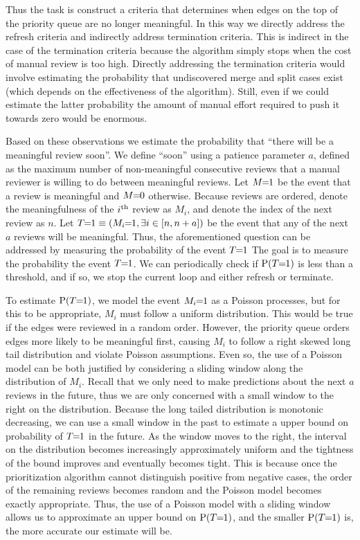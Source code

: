 Thus the task is construct a criteria that determines when edges on the top of the priority queue are no longer
  meaningful.
In this way we directly address the refresh criteria and indirectly address termination criteria.
This is indirect in the case of the termination criteria because the algorithm simply stops when the cost of
  manual review is too high.
Directly addressing the termination criteria would involve estimating the probability that undiscovered merge and
  split cases exist (which depends on the effectiveness of the algorithm).
Still, even if we could estimate the latter probability the amount of manual effort required to push it towards
  zero would be enormous.



Based on these observations we estimate the probability that ``there will be a meaningful review soon''. We define
``soon'' using a patience parameter $a$, defined as the maximum number of non-meaningful consecutive reviews that a
manual reviewer is willing to do between meaningful reviews. Let $M\mkern-6mu=\mkern-6mu1$ be the event that a review is meaningful
and $M\mkern-6mu=\mkern-6mu0$ otherwise. Because reviews are ordered, denote the meaningfulness of the $i^{\textrm{th}}$ review as $M_i$, and
denote the index of the next review as $n$. Let $T\mkern-6mu=\mkern-6mu1 \equiv (M_i\mkern-6mu=\mkern-6mu1, \exists i \in [n, n + a])$ be the event
that any of the next $a$ reviews will be meaningful. Thus, the aforementioned question can be addressed by
measuring the probability of the event $T\mkern-6mu=\mkern-6mu1$ The goal is to measure the probability the event $T\mkern-6mu=\mkern-6mu1$. We can
periodically check if $\mathbin{\operatorname{P}}(T\mkern-6mu=\mkern-6mu1)$ is less than a threshold, and if so, we stop the current loop and either
refresh or terminate.

To estimate $\mathbin{\operatorname{P}}(T\mkern-6mu=\mkern-6mu1)$, we model the event $M_i\mkern-6mu=\mkern-6mu1$ as a Poisson processes, but for this to be appropriate,
$M_i$ must follow a uniform distribution. This would be true if the edges were reviewed in a random order. However,
the priority queue orders edges more likely to be meaningful first, causing $M_i$ to follow a right skewed long
tail distribution and violate Poisson assumptions. Even so, the use of a Poisson model can be both justified by
considering a sliding window along the distribution of $M_i$. Recall that we only need to make predictions about
the next $a$ reviews in the future, thus we are only concerned with a small window to the right on the
distribution. Because the long tailed distribution is monotonic decreasing, we can use a small window in the past
to estimate a upper bound on probability of $T\mkern-6mu=\mkern-6mu1$ in the future. As the window moves to the right, the interval
on the distribution becomes increasingly approximately uniform and the tightness of the bound improves and
eventually becomes tight. This is because once the prioritization algorithm cannot distinguish positive from
negative cases, the order of the remaining reviews becomes random and the Poisson model becomes exactly
appropriate. Thus, the use of a Poisson model with a sliding window allows us to approximate an upper bound on
$\mathbin{\operatorname{P}}(T\mkern-6mu=\mkern-6mu1)$, and the smaller $\mathbin{\operatorname{P}}(T\mkern-6mu=\mkern-6mu1)$ is, the more accurate our estimate will be.


